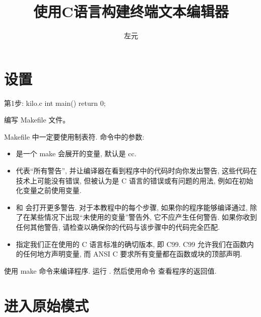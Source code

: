 \documentclass[lang=cn,newtx,10pt,scheme=chinese]{elegantbook}
\title{使用C语言构建终端文本编辑器}
\author{左元}
\begin{document}
\maketitle
\frontmatter

\tableofcontents

\mainmatter

\chapter{设置}

\begin{mycode}{第1步: kilo.c}
int main() {
  return 0;
}
\end{mycode}

编写 Makefile 文件。


Makefile 中一定要使用制表符. 命令中的参数:

\begin{itemize}
    \item {} 是一个 make 会展开的变量, 默认是 cc.
    \item {} 代表``所有警告'', 并让编译器在看到程序中的代码时向你发出警告, 这些代码在技术上可能没有错误, 但被认为是 C 语言的错误或有问题的用法, 例如在初始化变量之前使用变量.
    \item {} 和  会打开更多警告. 对于本教程中的每个步骤, 如果你的程序能够编译通过, 除了在某些情况下出现``未使用的变量''警告外, 它不应产生任何警告. 如果你收到任何其他警告, 请检查以确保你的代码与该步骤中的代码完全匹配.
    \item {} 指定我们正在使用的 C 语言标准的确切版本, 即 C99. C99 允许我们在函数内的任何地方声明变量, 而 ANSI C 要求所有变量都在函数或块的顶部声明.
\end{itemize}

使用 make 命令来编译程序. 运行  . 然后使用命令  查看程序的返回值.

\chapter{进入原始模式}
\end{document}
